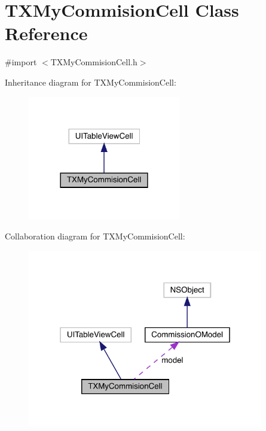 \hypertarget{interface_t_x_my_commision_cell}{}\section{T\+X\+My\+Commision\+Cell Class Reference}
\label{interface_t_x_my_commision_cell}


{\ttfamily \#import $<$T\+X\+My\+Commision\+Cell.\+h$>$}



Inheritance diagram for T\+X\+My\+Commision\+Cell\+:\nopagebreak
\begin{figure}[H]
\begin{center}
\leavevmode
\includegraphics[width=189pt]{interface_t_x_my_commision_cell__inherit__graph}
\end{center}
\end{figure}


Collaboration diagram for T\+X\+My\+Commision\+Cell\+:\nopagebreak
\begin{figure}[H]
\begin{center}
\leavevmode
\includegraphics[width=292pt]{interface_t_x_my_commision_cell__coll__graph}
\end{center}
\end{figure}

